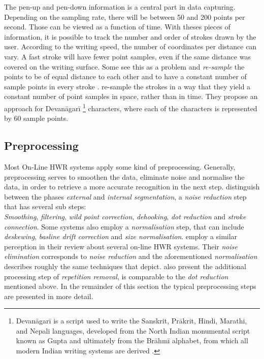 The pen-up and pen-down information is a central part in data capturing. 
Depending on the sampling rate, there will be between 50 and 200 points per 
second. Those can be viewed as a function of time.
With theses pieces of information, it is possible to track the number and order
of strokes drawn by the user. According to the writing speed, the number of 
coordinates per distance can vary. A fast stroke will have fewer point samples,
even if the same distance was covered on the writing surface.
Some see this as a problem and \emph{re-sample} the points to be of equal 
distance to each other and to have a constant number of sample points in every 
stroke .
 re-sample the strokes in a way that they yield a constant 
number of point samples in space, rather than in time. They propose an approach 
for Devanāgarī
\footnote 
{
Devanāgarī is a script used to write the Sanskrit, Prākrit, Hindi, Marathi, 
and Nepali languages, developed from the North Indian monumental script known 
as Gupta and ultimately from the Brāhmī alphabet, from which all modern Indian 
writing systems are derived \cite{EncyclopediaBritannicaDevanagari}.
} 
characters, where each of the characters is represented by 60 sample points.

\subsection{Preprocessing}
\label{sec:preprocessing}


Most On-Line HWR systems apply some kind of preprocessing. Generally, 
preprocessing serves to smoothen the data, eliminate noise and normalise the
data, in order to retrieve a more accurate recognition in the next step.
 distinguish between the phases \emph{external} and 
\emph{internal segmentation}, a \emph{noise reduction} step that has several 
sub steps:\\
\emph{Smoothing}, \emph{filtering}, \emph{wild point correction}, 
\emph{dehooking}, \emph{dot reduction} and \emph{stroke connection}.
Some systems also employ a \emph{normalisation} step, that can include
\emph{deskewing}, \emph{basline drift correction} and \emph{size normalisation}.
 employ a similar perception in their review about several
on-line HWR systems. Their \emph{noise elimination} corresponds to 
\emph{noise reduction} and the aforementioned \emph{normalisation} describes 
roughly the same techniques that  depict.
 also present the additional processing step of 
\emph{repetition removal}, is comparable to the \emph{dot reduction} mentioned 
above. In the remainder of this section the typical preprocessing steps are 
presented in more detail.


